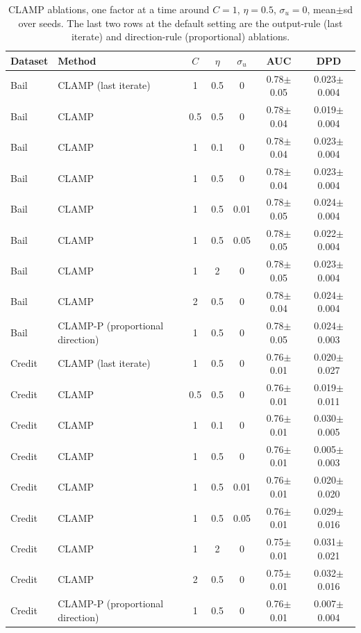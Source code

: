 \begin{table}[t]
\centering
\footnotesize
\caption{CLAMP ablations, one factor at a time around $C=1$, $\eta=0.5$, $\sigma_u=0$, mean$\pm$sd over seeds. The last two rows at the default setting are the output-rule (last iterate) and direction-rule (proportional) ablations.}
\label{tab:e6_ablation}
\setlength{\tabcolsep}{3pt}
\begin{tabular}{lp{3.6cm}ccccc}
\toprule
Dataset & Method & $C$ & $\eta$ & $\sigma_u$ & AUC & DPD \\
\midrule
Bail & CLAMP (last iterate) & 1 & 0.5 & 0 & 0.78$\pm$0.05 & 0.023$\pm$0.004 \\
Bail & CLAMP & 0.5 & 0.5 & 0 & 0.78$\pm$0.04 & 0.019$\pm$0.004 \\
Bail & CLAMP & 1 & 0.1 & 0 & 0.78$\pm$0.04 & 0.023$\pm$0.004 \\
Bail & CLAMP & 1 & 0.5 & 0 & 0.78$\pm$0.04 & 0.023$\pm$0.004 \\
Bail & CLAMP & 1 & 0.5 & 0.01 & 0.78$\pm$0.05 & 0.024$\pm$0.004 \\
Bail & CLAMP & 1 & 0.5 & 0.05 & 0.78$\pm$0.05 & 0.022$\pm$0.004 \\
Bail & CLAMP & 1 & 2 & 0 & 0.78$\pm$0.05 & 0.023$\pm$0.004 \\
Bail & CLAMP & 2 & 0.5 & 0 & 0.78$\pm$0.04 & 0.024$\pm$0.004 \\
Bail & CLAMP-P (proportional direction) & 1 & 0.5 & 0 & 0.78$\pm$0.05 & 0.024$\pm$0.003 \\
Credit & CLAMP (last iterate) & 1 & 0.5 & 0 & 0.76$\pm$0.01 & 0.020$\pm$0.027 \\
Credit & CLAMP & 0.5 & 0.5 & 0 & 0.76$\pm$0.01 & 0.019$\pm$0.011 \\
Credit & CLAMP & 1 & 0.1 & 0 & 0.76$\pm$0.01 & 0.030$\pm$0.005 \\
Credit & CLAMP & 1 & 0.5 & 0 & 0.76$\pm$0.01 & 0.005$\pm$0.003 \\
Credit & CLAMP & 1 & 0.5 & 0.01 & 0.76$\pm$0.01 & 0.020$\pm$0.020 \\
Credit & CLAMP & 1 & 0.5 & 0.05 & 0.76$\pm$0.01 & 0.029$\pm$0.016 \\
Credit & CLAMP & 1 & 2 & 0 & 0.75$\pm$0.01 & 0.031$\pm$0.021 \\
Credit & CLAMP & 2 & 0.5 & 0 & 0.75$\pm$0.01 & 0.032$\pm$0.016 \\
Credit & CLAMP-P (proportional direction) & 1 & 0.5 & 0 & 0.76$\pm$0.01 & 0.007$\pm$0.004 \\
\bottomrule
\end{tabular}
\end{table}
